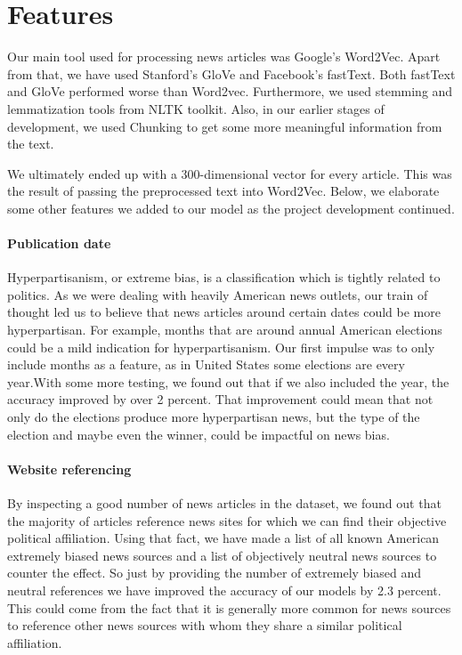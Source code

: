 \section{Features}
\label{sec:feature}

Our main tool used for processing news articles was Google's Word2Vec. Apart from that, we have used Stanford's GloVe and Facebook's fastText. Both fastText and GloVe performed worse than Word2vec. Furthermore, we used stemming and lemmatization tools from NLTK toolkit. Also, in our earlier stages of development, we used Chunking to get some more meaningful information from the text. 

We ultimately ended up with a 300-dimensional vector for every article. This was the result of passing the preprocessed text into Word2Vec. Below, we elaborate some other features we added to our model as the project development continued.


\paragraph{Publication date\\}


Hyperpartisanism, or extreme bias, is a classification which is tightly related to politics. As we were dealing with heavily American news outlets, our train of thought led us to believe that news articles around certain dates could be more hyperpartisan. For example, months that are around annual American elections could be a mild indication for hyperpartisanism. Our first impulse was to only include months as a feature, as in United States some elections are every year.With some more testing, we found out that if we also included the year, the accuracy improved by over 2 percent. That improvement could mean that not only do the elections produce more hyperpartisan news, but the type of the election and maybe even the winner, could be impactful on news bias.

\paragraph{Website referencing\\}


By inspecting a good number of news articles in the dataset, we found out that the majority of articles reference news sites for which we can find their objective political affiliation. Using that fact, we have made a list of all known American extremely biased news sources and a list of objectively neutral news sources to counter the effect. So just by providing the number of extremely biased and neutral references we have improved the accuracy of our models by 2.3 percent. This could come from the fact that it is generally more common for news sources to reference other news sources with whom they share a similar political affiliation.


